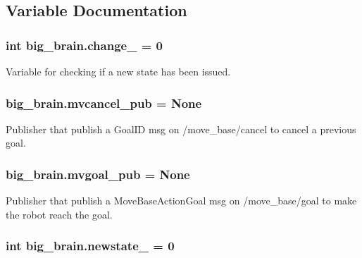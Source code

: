 \subsection{Variable Documentation}
\subsubsection[{\texorpdfstring{change\+\_\+}{change_}}]{\setlength{\rightskip}{0pt plus 5cm}int big\+\_\+brain.\+change\+\_\+ = 0}\hypertarget{namespacebig__brain_ac43f9e8255d9b336a4f3ebe4dc3d2246}{}\label{namespacebig__brain_ac43f9e8255d9b336a4f3ebe4dc3d2246}


Variable for checking if a new state has been issued. 

\subsubsection[{\texorpdfstring{mvcancel\+\_\+pub}{mvcancel_pub}}]{\setlength{\rightskip}{0pt plus 5cm}big\+\_\+brain.\+mvcancel\+\_\+pub = None}\hypertarget{namespacebig__brain_acbbe2e86c0b737f0caaff69ce22b4aa8}{}\label{namespacebig__brain_acbbe2e86c0b737f0caaff69ce22b4aa8}


Publisher that publish a Goal\+ID msg on /move\+\_\+base/cancel to cancel a previous goal. 

\subsubsection[{\texorpdfstring{mvgoal\+\_\+pub}{mvgoal_pub}}]{\setlength{\rightskip}{0pt plus 5cm}big\+\_\+brain.\+mvgoal\+\_\+pub = None}\hypertarget{namespacebig__brain_a757b56b184f850f2599be2279ac94777}{}\label{namespacebig__brain_a757b56b184f850f2599be2279ac94777}


Publisher that publish a Move\+Base\+Action\+Goal msg on /move\+\_\+base/goal to make the robot reach the goal. 

\subsubsection[{\texorpdfstring{newstate\+\_\+}{newstate_}}]{\setlength{\rightskip}{0pt plus 5cm}int big\+\_\+brain.\+newstate\+\_\+ = 0}\hypertarget{namespacebig__brain_a28f405a0651539e59bd455a35ab07a3c}{}\label{namespacebig__brain_a28f405a0651539e59bd455a35ab07a3c}



